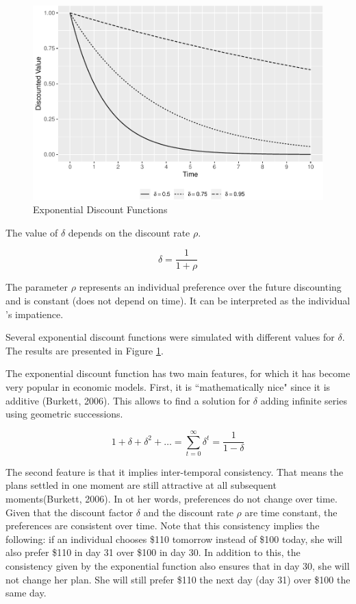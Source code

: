\documentclass[]{article}
\begin{document}
\begin{figure}

{\centering \includegraphics[width=0.75\linewidth]{Behavioral_v_pdf_files/figure-latex/exp-1} 

}

\caption{Exponential Discount Functions}\label{fig:exp}
\end{figure}

The value of \(\delta\) depends on the discount rate \(\rho\).

\[
\delta = \frac{1}{1+\rho}
\]

The parameter \(\rho\) represents an individual preference over the future discounting and is constant (does not depend on time). It can be interpreted as the individual 's impatience.

Several exponential discount functions were simulated with different values for \(\delta\). The results are presented in Figure \ref{fig:exp}.

The exponential discount function has two main features, for which it has become very popular in economic models. First, it is ``mathematically nice" since it is additive (Burkett, 2006). This allows to find a solution for \(\delta\) adding infinite series using geometric successions.

\[
1 + \delta + \delta^2 + \dots = \sum_{t=0}^{\infty}\delta^t = \frac{1}{1 - \delta}
\]

The second feature is that it implies inter-temporal consistency. That means the plans settled in one moment are still attractive at all subsequent moments(Burkett, 2006). In ot her words, preferences do not change over time. Given that the discount factor \(\delta\) and the discount rate \(\rho\) are time constant, the preferences are consistent over time. Note that this consistency implies the following: if an individual chooses \$110 tomorrow instead of \$100 today, she will also prefer \$110 in day 31 over \$100 in day 30. In addition to this, the consistency given by the exponential function also ensures that in day 30, she will not change her plan. She will still prefer \$110 the next day (day 31) over \$100 the same day.
\end{document}
